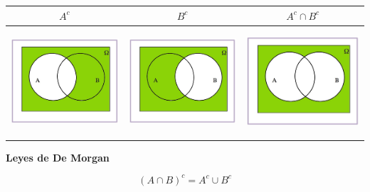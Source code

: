 \documentclass[]{book}
\begin{document}
\begin{longtable}[]{@{}ccc@{}}
\toprule
\(A^c\) & \(B^c\) & \(A^c\cap B^c\)\tabularnewline
\midrule
\endhead
\includegraphics[width=\textwidth,height=4cm]{Images/proba1dibujos/demorgan8.jpg} & \includegraphics[width=\textwidth,height=4cm]{Images/proba1dibujos/demorgan9.jpg} & \includegraphics[width=\textwidth,height=4cm]{Images/proba1dibujos/demorgan10.jpg}\tabularnewline
\bottomrule
\end{longtable}

\textbf{Leyes de De Morgan}

\[(A\cap B)^c=A^c\cup B^c\]
\end{document}
